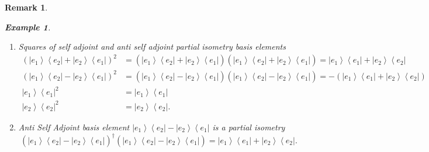 \documentclass[aps,preprint]{revtex4}%
\newtheorem{example}[theorem]{Example}
\newtheorem{remark}[theorem]{Remark}
\begin{document}
\begin{remark}
\begin{enumerate}
\begin{example}
\begin{enumerate}
\item Squares of self adjoint and anti self adjoint partial isometry basis
elements%
\begin{align}
\left(  \left\vert e_{1}\right\rangle \left\langle e_{2}\right\vert
+\left\vert e_{2}\right\rangle \left\langle e_{1}\right\vert \right)  ^{2}  &
=\left(  \overset{}{\left\vert e_{1}\right\rangle \left\langle e_{2}%
\right\vert +\left\vert e_{2}\right\rangle \left\langle e_{1}\right\vert
}\right)  \left(  \overset{}{\left\vert e_{1}\right\rangle \left\langle
e_{2}\right\vert +\left\vert e_{2}\right\rangle \left\langle e_{1}\right\vert
}\right)  =\left\vert e_{1}\right\rangle \left\langle e_{1}\right\vert
+\left\vert e_{2}\right\rangle \left\langle e_{2}\right\vert \\
\left(  \left\vert e_{1}\right\rangle \left\langle e_{2}\right\vert
-\left\vert e_{2}\right\rangle \left\langle e_{1}\right\vert \right)  ^{2}  &
=\left(  \overset{}{\left\vert e_{1}\right\rangle \left\langle e_{2}%
\right\vert -\left\vert e_{2}\right\rangle \left\langle e_{1}\right\vert
}\right)  \left(  \overset{}{\left\vert e_{1}\right\rangle \left\langle
e_{2}\right\vert -\left\vert e_{2}\right\rangle \left\langle e_{1}\right\vert
}\right)  =-\left(  \left\vert e_{1}\right\rangle \left\langle e_{1}%
\right\vert +\left\vert e_{2}\right\rangle \left\langle e_{2}\right\vert
\right) \\
\left\vert e_{1}\right\rangle \left\langle e_{1}\right\vert ^{2}  &
=\left\vert e_{1}\right\rangle \left\langle e_{1}\right\vert \\
\left\vert e_{2}\right\rangle \left\langle e_{2}\right\vert ^{2}  &
=\left\vert e_{2}\right\rangle \left\langle e_{2}\right\vert .
\end{align}


\item Anti Self Adjoint basis element $\left\vert e_{1}\right\rangle
\left\langle e_{2}\right\vert -\left\vert e_{2}\right\rangle \left\langle
e_{1}\right\vert $ is a partial isometry
\begin{equation}
\left(  \overset{}{\left\vert e_{1}\right\rangle \left\langle e_{2}\right\vert
-\left\vert e_{2}\right\rangle \left\langle e_{1}\right\vert }\right)
^{\dagger}\left(  \overset{}{\left\vert e_{1}\right\rangle \left\langle
e_{2}\right\vert -\left\vert e_{2}\right\rangle \left\langle e_{1}\right\vert
}\right)  =\left\vert e_{1}\right\rangle \left\langle e_{1}\right\vert
+\left\vert e_{2}\right\rangle \left\langle e_{2}\right\vert .
\end{equation}



\end{enumerate}
\end{example}
\end{enumerate}
\end{remark}
\end{document}
